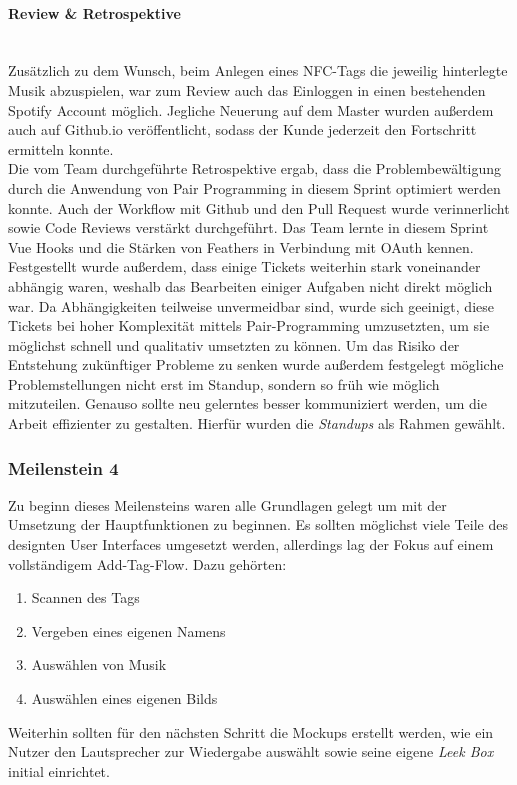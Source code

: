 \documentclass[10pt, a4paper]{article}
\begin{document}
\paragraph*{Review \& Retrospektive} $~$ \\
Zusätzlich zu dem Wunsch, beim Anlegen eines NFC-Tags die jeweilig hinterlegte Musik abzuspielen, war zum Review auch das Einloggen
in einen bestehenden Spotify Account möglich. Jegliche Neuerung auf dem Master wurden außerdem auch auf Github.io veröffentlicht, sodass der Kunde jederzeit
den Fortschritt ermitteln konnte.
\\
Die vom Team durchgeführte Retrospektive ergab, dass die Problembewältigung durch die Anwendung von Pair Programming in diesem Sprint optimiert werden konnte.
Auch der Workflow mit Github und den Pull Request wurde verinnerlicht sowie Code Reviews verstärkt durchgeführt. Das Team lernte in diesem Sprint
Vue Hooks und die Stärken von Feathers in Verbindung mit OAuth kennen. Festgestellt wurde außerdem, dass einige Tickets weiterhin stark voneinander abhängig waren,
weshalb das Bearbeiten einiger Aufgaben nicht direkt möglich war. Da Abhängigkeiten teilweise unvermeidbar sind, wurde sich geeinigt, diese Tickets bei hoher
Komplexität mittels Pair-Programming umzusetzten, um sie möglichst schnell und qualitativ umsetzten zu können. Um das Risiko der Entstehung zukünftiger Probleme
zu senken wurde außerdem festgelegt mögliche Problemstellungen nicht erst im Standup, sondern so früh wie möglich mitzuteilen. Genauso sollte neu gelerntes besser
kommuniziert werden, um die Arbeit effizienter zu gestalten. Hierfür wurden die \textit{Standups} als Rahmen gewählt.

\subsubsection*{Meilenstein 4}
Zu beginn dieses Meilensteins waren alle Grundlagen gelegt um mit der Umsetzung der Hauptfunktionen zu beginnen.
Es sollten möglichst viele Teile des designten User Interfaces umgesetzt werden, allerdings lag der Fokus auf einem vollständigem \glqq Add-Tag-Flow\grqq.
Dazu gehörten:
\begin{enumerate}
  \item Scannen des Tags
  \item Vergeben eines eigenen Namens
  \item Auswählen von Musik
  \item Auswählen eines eigenen Bilds
\end{enumerate}
Weiterhin sollten für den nächsten Schritt die Mockups erstellt werden, wie ein Nutzer den Lautsprecher zur Wiedergabe auswählt sowie seine eigene \textit{Leek Box} initial einrichtet.
\end{document}
